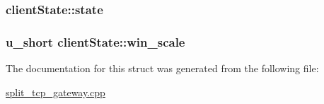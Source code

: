 \hypertarget{structclientState_aef8cf7a72af3bae798bd4e8326b5d61b}{
\subsubsection[{state}]{ {\bf client\-State\-::state}}}\label{structclientState_aef8cf7a72af3bae798bd4e8326b5d61b}
\hypertarget{structclientState_afa81748837006012193d8cba0509d3db}{
\subsubsection[{win\-\_\-scale}]{\setlength{\rightskip}{0pt plus 5cm}u\-\_\-short {\bf client\-State\-::win\-\_\-scale}}}\label{structclientState_afa81748837006012193d8cba0509d3db}


\-The documentation for this struct was generated from the following file\-:\begin{DoxyCompactItemize}
\item 
\hyperlink{split__tcp__gateway_8cpp}{split\-\_\-tcp\-\_\-gateway.\-cpp}\end{DoxyCompactItemize}
